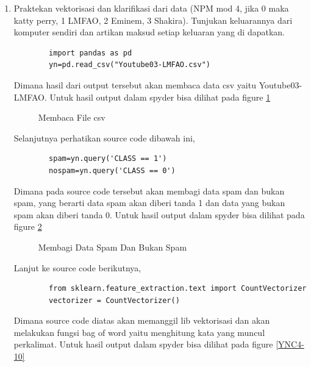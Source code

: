\begin{enumerate}
\item Praktekan vektorisasi dan klarifikasi dari data (NPM mod 4, jika 0 maka katty perry, 1 LMFAO, 2 Eminem, 3 Shakira). Tunjukan keluarannya dari komputer sendiri dan artikan maksud setiap keluaran yang di dapatkan.

	\begin{verbatim}
		import pandas as pd
		yn=pd.read_csv("Youtube03-LMFAO.csv")
	\end{verbatim}

Dimana hasil dari output tersebut akan membaca data csv yaitu Youtube03-LMFAO. Untuk hasil output dalam spyder bisa dilihat pada figure \ref{YNC4-8}

	\begin{figure}[ht]
		\caption{Membaca File csv}
		\label{YNC4-8}
	\end{figure}	

Selanjutnya perhatikan source code dibawah ini,

	\begin{verbatim}
		spam=yn.query('CLASS == 1')
		nospam=yn.query('CLASS == 0')
	\end{verbatim}	

Dimana pada source code tersebut akan membagi data spam dan bukan spam, yang berarti data spam akan diberi tanda 1 dan data yang bukan spam akan diberi tanda 0. Untuk hasil output dalam spyder bisa dilihat pada figure \ref{YNC4-9}

	\begin{figure}[ht]
		\caption{Membagi Data Spam Dan Bukan Spam}
		\label{YNC4-9}
	\end{figure}	

Lanjut ke source code berikutnya,

	\begin{verbatim}
		from sklearn.feature_extraction.text import CountVectorizer
		vectorizer = CountVectorizer()
	\end{verbatim}	

Dimana source code diatas akan memanggil lib vektorisasi dan akan melakukan fungsi bag of word yaitu menghitung kata yang muncul perkalimat. Untuk hasil output dalam spyder bisa dilihat pada figure \ref{YNC4-10}


\end{enumerate}
